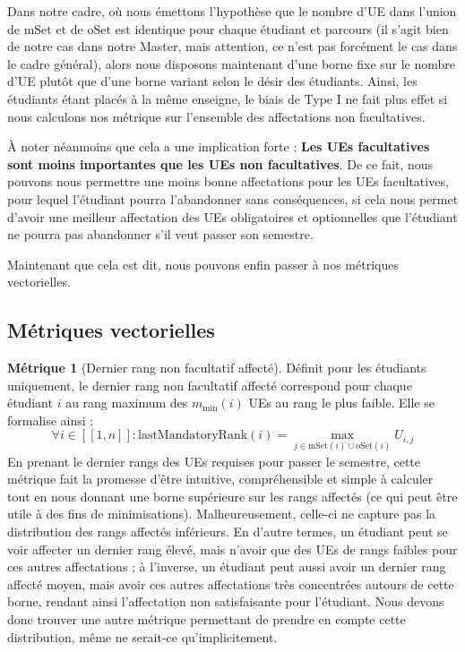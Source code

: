 \documentclass{rapport}
\theoremstyle{definition}
\theoremstyle{remark}
\theoremstyle{plain}
\theoremstyle{definition}
\newtheorem*{metric}{Métrique}
\theoremstyle{remark}
\newcommand{\llbracket}{[\![}
\newcommand{\rrbracket}{]\!]}
\begin{document}
Dans notre cadre, où nous émettons l'hypothèse que le nombre d'UE dans l'union de $\text{mSet}$ et de $\text{oSet}$ est identique pour chaque étudiant et parcours (il s'agit bien de notre cas dans notre Master, mais attention, ce n'est pas forcément le cas dans le cadre général), alors nous disposons maintenant d'une borne fixe sur le nombre d'UE plutôt que d'une borne variant selon le désir des étudiants.
Ainsi, les étudiants étant placés à la même enseigne, le biais de Type I ne fait plus effet si nous calculons nos métrique sur l'ensemble des affectations non facultatives.

À noter néanmoins que cela a une implication forte : \textbf{Les UEs facultatives sont moins importantes que les UEs non facultatives}.
De ce fait, nous pouvons nous permettre une moins bonne affectations pour les UEs facultatives, pour lequel l'étudiant pourra l'abandonner sans conséquences, si cela nous permet d'avoir une meilleur affectation des UEs obligatoires et optionnelles que l'étudiant ne pourra pas abandonner s'il veut passer son semestre.

Maintenant que cela est dit, nous pouvons enfin passer à nos métriques vectorielles.

\subsection{Métriques vectorielles}
\begin{metric}[Dernier rang non facultatif affecté]
    Définit pour les étudiants uniquement, le dernier rang non facultatif affecté correspond pour chaque étudiant $i$ au rang maximum des $m_{\min}(i)$ UEs au rang le plus faible.
    Elle se formalise ainsi :
    $$
        \forall i\in\llbracket 1, n\rrbracket : \text{lastMandatoryRank}(i) = \max_{j\in \text{mSet}(i)\cup\text{oSet}(i)} U_{i,j}
    $$
    En prenant le dernier rangs des UEs requises pour passer le semestre, cette métrique fait la promesse d'être intuitive, compréhensible et simple à calculer tout en nous donnant une borne supérieure sur les rangs affectés (ce qui peut être utile à des fins de minimisations).
    Malheureusement, celle-ci ne capture pas la distribution des rangs affectés inférieurs.
    En d'autre termes, un étudiant peut se voir affecter un dernier rang élevé, mais n'avoir que des UEs de rangs faibles pour ces autres affectations ; à l'inverse, un étudiant peut aussi avoir un dernier rang affecté moyen, mais avoir ces autres affectations très concentrées autours de cette borne, rendant ainsi l'affectation non satisfaisante pour l'étudiant.
    Nous devons donc trouver une autre métrique permettant de prendre en compte cette distribution, même ne serait-ce qu'implicitement.
\end{metric}
\end{document}
